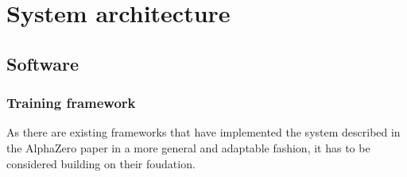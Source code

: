 \chapter{System architecture}

\section{Software}

\subsection{Training framework}
As there are existing frameworks that have implemented the system described in the AlphaZero paper in a more general and adaptable fashion, it has to be considered building on their foudation.
